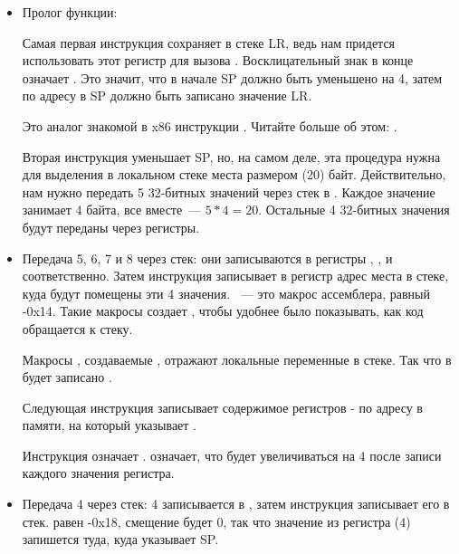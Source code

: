 \begin{itemize}
\item Пролог функции:

Самая первая инструкция  
сохраняет в стеке \ac{LR}, ведь нам придется использовать этот регистр для вызова \printf.
Восклицательный знак в конце означает .
Это значит, что в начале \ac{SP} должно быть уменьшено на 4, затем по адресу в \ac{SP} должно быть записано значение \ac{LR}.

Это аналог знакомой в x86 инструкции \PUSH. Читайте больше об этом: .

Вторая инструкция  уменьшает  \ac{SP}, но, на самом деле, эта процедура нужна для выделения в локальном стеке места размером  (20) байт.
Действительно, нам нужно передать 5 32-битных значений через стек в \printf. Каждое значение занимает 4 байта, все вместе~--- $5*4=20$.
Остальные 4 32-битных значения будут переданы через регистры.

\item Передача 5, 6, 7 и 8 через стек:
они записываются в регистры , ,  и  соответственно.
Затем инструкция  
записывает в регистр  адрес места в стеке, куда будут помещены эти 4 значения.
~--- это макрос ассемблера, равный -0x14.
Такие макросы создает \IDA, чтобы удобнее было показывать, как код обращается к стеку.

Макросы , создаваемые \IDA, отражают локальные переменные в стеке. Так что в  будет записано .

Следующая инструкция  записывает содержимое регистров - по адресу в памяти, на который указывает .

Инструкция  означает . 
 означает, что  будет увеличиваться на 4 после записи каждого значения регистра.

\item Передача 4 через стек:
4 записывается в , затем инструкция  записывает его в стек.
 равен -0x18, смещение будет 0, 
так что значение из регистра  (4) запишется туда, куда указывает \ac{SP}.


\end{itemize}
